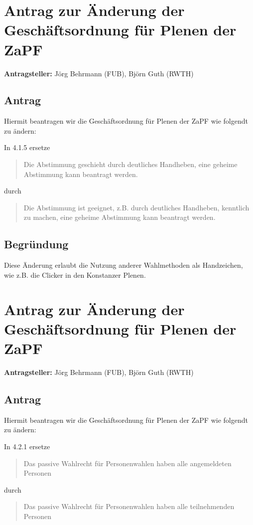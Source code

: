 \documentclass[draft,10pt,oneside]{scrartcl}
\begin{document}
\section*{Antrag zur Änderung der Geschäftsordnung für Plenen der ZaPF}

\textbf{Antragsteller:} Jörg Behrmann (FUB), Björn Guth (RWTH)

\subsection*{Antrag}

Hiermit beantragen wir die Geschäftsordnung für Plenen der ZaPF wie folgendt zu ändern:

In 4.1.5 ersetze
\begin{quote}
	Die Abstimmung geschieht durch deutliches Handheben, eine geheime
	Abstimmung kann beantragt werden.
\end{quote}
durch
\begin{quote}
	Die Abstimmung ist geeignet, z.B. durch deutliches Handheben, kenntlich zu
	machen, eine geheime Abstimmung kann beantragt werden.
\end{quote}

\subsection*{Begründung}
Diese Änderung erlaubt die Nutzung anderer Wahlmethoden als Handzeichen, wie
z.B. die Clicker in den Konstanzer Plenen.

\newpage

\section*{Antrag zur Änderung der Geschäftsordnung für Plenen der ZaPF}

\textbf{Antragsteller:} Jörg Behrmann (FUB), Björn Guth (RWTH)

\subsection*{Antrag}

Hiermit beantragen wir die Geschäftsordnung für Plenen der ZaPF wie folgendt zu ändern:

In 4.2.1 ersetze
\begin{quote}
	Das passive Wahlrecht für Personenwahlen haben alle angemeldeten Personen
\end{quote}
durch
\begin{quote}
	Das passive Wahlrecht für Personenwahlen haben alle teilnehmenden Personen
\end{quote}
\end{document}

